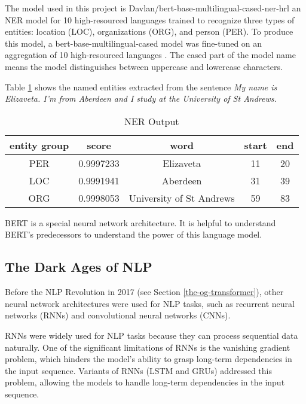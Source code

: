 

The model used in this project is {\selectfont Davlan/bert-base-multilingual-cased-ner-hrl} an NER model for 10 high-resourced languages trained to recognize three types of entities: location (LOC), organizations (ORG), and person (PER). To produce this model, a {\selectfont bert-base-multilingual-cased} model was fine-tuned on an aggregation of 10 high-resourced languages \cite{noauthor_bert-base-multilingual-cased_nodate}. The {\selectfont cased} part of the model name means the model distinguishes between uppercase and lowercase characters.

Table \ref{tab:NER-output} shows the named entities extracted from the sentence \textit{My name is Elizaveta. I'm from Aberdeen and I study at the University of St Andrews.}

\begin{table}[ht]
  \centering
  \begin{tabular}{|c|c|c|c|c|}
    \hline
    \textbf{entity group} & \textbf{score} & \textbf{word} & \textbf{start} & \textbf{end} \\
    \hline{}
    
    PER  &  0.9997233  &  Elizaveta  &  11  &  20  \\
    LOC  &  0.9991941  &  Aberdeen  &  31  &  39  \\
    ORG  &  0.9998053  &  University of St Andrews  &  59  &  83  \\
    \hline
  \end{tabular}
  \caption{NER Output}
  \label{tab:NER-output}
\end{table}

BERT is a special neural network architecture. It is helpful to understand BERT's predecessors to understand the power of this language model.

\subsection{The Dark Ages of NLP}

Before the NLP Revolution in 2017 (see Section \ref{the-og-transformer}), other neural network architectures were used for NLP tasks, such as recurrent neural networks (RNNs) and convolutional neural networks (CNNs).

RNNs were widely used for NLP tasks because they can process sequential data naturally. One of the significant limitations of RNNs is the vanishing gradient problem, which hinders the model's ability to grasp long-term dependencies in the input sequence. Variants of RNNs (LSTM and GRUs) addressed this problem, allowing the models to handle long-term dependencies in the input sequence. \cite{camacho-collados_embeddings_2022}

